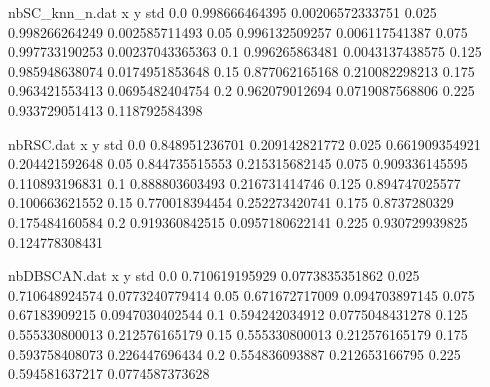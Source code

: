 \begin{filecontents}{nbSC_knn_n.dat}
x y std
0.0 0.998666464395 0.00206572333751
0.025 0.998266264249 0.002585711493
0.05 0.996132509257 0.006117541387
0.075 0.997733190253 0.00237043365363
0.1 0.996265863481 0.0043137438575
0.125 0.985948638074 0.0174951853648
0.15 0.877062165168 0.210082298213
0.175 0.963421553413 0.0695482404754
0.2 0.962079012694 0.0719087568806
0.225 0.933729051413 0.118792584398
\end{filecontents}
\begin{filecontents}{nbRSC.dat}
x y std
0.0 0.848951236701 0.209142821772
0.025 0.661909354921 0.204421592648
0.05 0.844735515553 0.215315682145
0.075 0.909336145595 0.110893196831
0.1 0.888803603493 0.216731414746
0.125 0.894747025577 0.100663621552
0.15 0.770018394454 0.252273420741
0.175 0.8737280329 0.175484160584
0.2 0.919360842515 0.0957180622141
0.225 0.930729939825 0.124778308431
\end{filecontents}
\begin{filecontents}{nbDBSCAN.dat}
x y std
0.0 0.710619195929 0.0773835351862
0.025 0.710648924574 0.0773240779414
0.05 0.671672717009 0.094703897145
0.075 0.67183909215 0.0947030402544
0.1 0.594242034912 0.0775048431278
0.125 0.555330800013 0.212576165179
0.15 0.555330800013 0.212576165179
0.175 0.593758408073 0.226447696434
0.2 0.554836093887 0.212653166795
0.225 0.594581637217 0.0774587373628
\end{filecontents}

